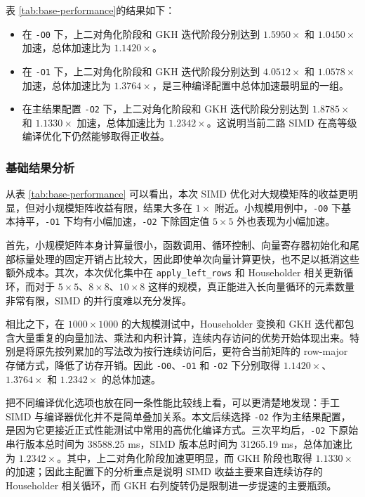 \documentclass[UTF8,a4paper]{ctexart}
\begin{document}
表 \ref{tab:base-performance}的结果如下：
\begin{itemize}
  \item 在 \texttt{-O0} 下，上二对角化阶段和 GKH 迭代阶段分别达到 \(1.5950\times\) 和 \(1.0450\times\) 加速，总体加速比为 \(1.1420\times\)。
  \item 在 \texttt{-O1} 下，上二对角化阶段和 GKH 迭代阶段分别达到 \(4.0512\times\) 和 \(1.0578\times\) 加速，总体加速比为 \(1.3764\times\)，是三种编译配置中总体加速最明显的一组。
  \item 在主结果配置 \texttt{-O2} 下，上二对角化阶段和 GKH 迭代阶段分别达到 \(1.8785\times\) 和 \(1.1330\times\) 加速，总体加速比为 \(1.2342\times\)。这说明当前二路 SIMD 在高等级编译优化下仍然能够取得正收益。
\end{itemize}

\subsubsection{基础结果分析}
从表 \ref{tab:base-performance} 可以看出，本次 SIMD 优化对大规模矩阵的收益更明显，但对小规模矩阵收益有限，结果大多在 \(1\times\) 附近。小规模用例中，\texttt{-O0} 下基本持平，\texttt{-O1} 下均有小幅加速，\texttt{-O2} 下除固定值 \(5\times5\) 外也表现为小幅加速。

首先，小规模矩阵本身计算量很小，函数调用、循环控制、向量寄存器初始化和尾部标量处理的固定开销占比较大，因此即使单次向量计算更快，也不足以抵消这些额外成本。其次，本次优化集中在 \texttt{apply\_left\_rows} 和 Householder 相关更新循环，而对于 \(5\times5\)、\(8\times8\)、\(10\times8\) 这样的规模，真正能进入长向量循环的元素数量非常有限，SIMD 的并行度难以充分发挥。

相比之下，在 \(1000\times1000\) 的大规模测试中，Householder 变换和 GKH 迭代都包含大量重复的向量加法、乘法和内积计算，连续内存访问的优势开始体现出来。特别是将原先按列累加的写法改为按行连续访问后，更符合当前矩阵的 row-major 存储方式，降低了访存开销。因此 \texttt{-O0}、\texttt{-O1} 和 \texttt{-O2} 下分别取得 \(1.1420\times\)、\(1.3764\times\) 和 \(1.2342\times\) 的总体加速。

把不同编译优化选项也放在同一条性能比较线上看，可以更清楚地发现：手工 SIMD 与编译器优化并不是简单叠加关系。本文后续选择 \texttt{-O2} 作为主结果配置，是因为它更接近正式性能测试中常用的高优化编译方式。三次平均后，\texttt{-O2} 下原始串行版本总时间为 38588.25 ms，SIMD 版本总时间为 31265.19 ms，总体加速比为 \(1.2342\times\)。其中，上二对角化阶段加速更明显，而 GKH 阶段也取得 \(1.1330\times\) 的加速；因此主配置下的分析重点是说明 SIMD 收益主要来自连续访存的 Householder 相关循环，而 GKH 右列旋转仍是限制进一步提速的主要瓶颈。
\end{document}
